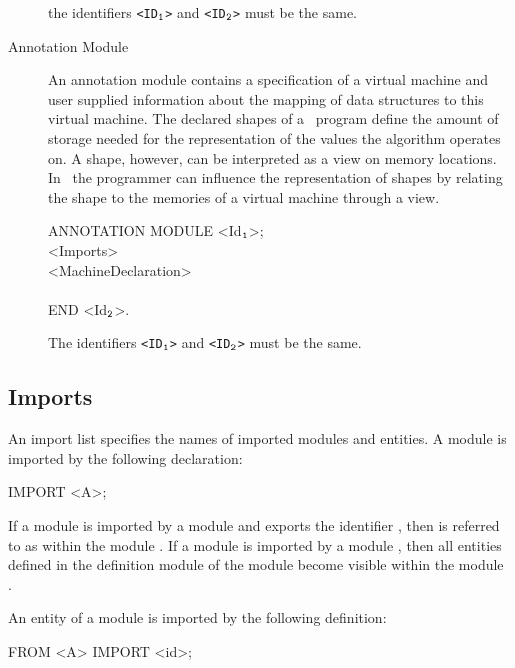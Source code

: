 \begin{description}
the identifiers {\tt <ID$_{\tt 1}$>} and {\tt <ID$_{\tt 2}$>} must be the
same.

\item[Annotation Module] An annotation module contains a specification
of a virtual machine and user supplied information about the mapping
of data structures to this virtual machine. The declared shapes of a
\Booster\ program define the amount of storage needed for the
representation of the values the algorithm operates on. A shape,
however, can be interpreted as a view on memory locations. In
\Booster\ the programmer can influence the representation of shapes by
relating the shape to the memories of a virtual machine through a
view.

\begin{frag}
ANNOTATION MODULE <Id$_{\tt 1}$>;\\
\> <Imports>\\
\> <MachineDeclaration>\\
\\
END <Id$_{\tt 2}$>.
\end{frag}

The identifiers {\tt <ID$_{\tt 1}$>} and {\tt <ID$_{\tt 2}$>} must be
the same.

\end{description}

\subsection*{Imports}

An import list specifies the names of imported modules and entities.
A module is imported by the following declaration:

\begin{frag}
IMPORT <A>;
\end{frag}

\noindent If a module  is imported by a module  and
 exports the identifier , then  is referred to
as  within the module . If a module  is
imported by a module , then all entities defined in the
definition module of the module  become visible within the
module .

An entity  of a module  is imported by the following
definition:

\begin{frag}
FROM <A> IMPORT <id>;
\end{frag}

